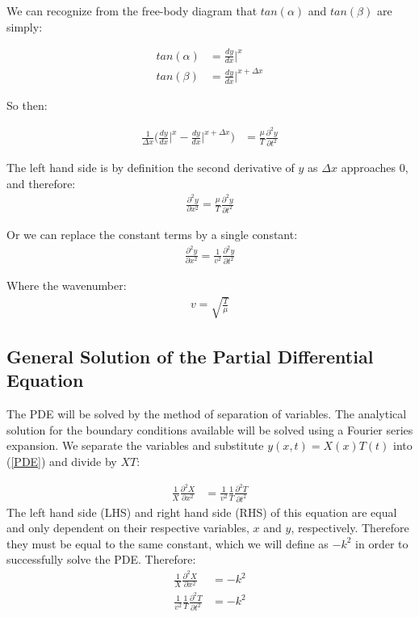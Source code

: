 \documentclass[%
 reprint,
 amsmath,amssymb,
 aps,
]{revtex4-1}
\begin{document}
We can recognize from the free-body diagram that $tan(\alpha)$  and $tan(\beta)$ are simply:

\begin{align}
tan(\alpha) &= \frac{dy}{dx} \Big|^x\\
tan(\beta) &= \frac{dy}{dx} \Big|^{x+\Delta x}
\end{align}

So then:

\begin{align}
 \frac{1}{\Delta x} \Big( \frac{dy}{dx} \Big|^x - \frac{dy}{dx} \Big|^{x+\Delta x}\Big) &=  \frac{\mu}{T} \frac{\partial^2 y}{\partial t^2}
\end{align}

The left hand side is by definition the second derivative of $y$ as $\Delta x$ approaches $0$, and therefore:
\begin{align}
\frac{\partial^2 y}{\partial x^2} = \frac{\mu}{T} \frac{\partial^2y}{\partial t^2}
\end{align}

Or we can replace the constant terms by a single constant:
\begin{align} \label{PDE}
\frac{\partial^2 y}{\partial x^2} = \frac{1}{v^2} \frac{\partial^2y}{\partial t^2}   
\end{align}

Where the wavenumber:
\begin{align}
v = \sqrt{\frac{T}{\mu}}
\end{align}

\subsection{\label{sec:level1}General Solution of the Partial Differential Equation}
The PDE will be solved by the method of separation of variables. The analytical solution for the boundary conditions available will be solved using a Fourier series expansion. We separate the variables and substitute $y(x,t) = X(x)T(t)$ into (\ref{PDE})  and divide by $XT$:

\begin{align}
\frac{1}{X} \frac{\partial^2 X}{\partial x^2} &=  \frac{1}{v^2} \frac{1}{T}\frac{\partial^2T}{\partial t^2}   
\end{align}
The left hand side (LHS) and right hand side (RHS) of this equation are equal and only dependent on their respective variables, $x$ and $y$, respectively. Therefore they must be equal to the same constant, which we will define as $-k^2$ in order to successfully solve the PDE. Therefore:
\begin{align}
\frac{1}{X} \frac{\partial^2 X}{\partial x^2} &= -k^2 \\
\frac{1}{v^2} \frac{1}{T}\frac{\partial^2T}{\partial t^2}  &= -k^2
\end{align}
\end{document}
